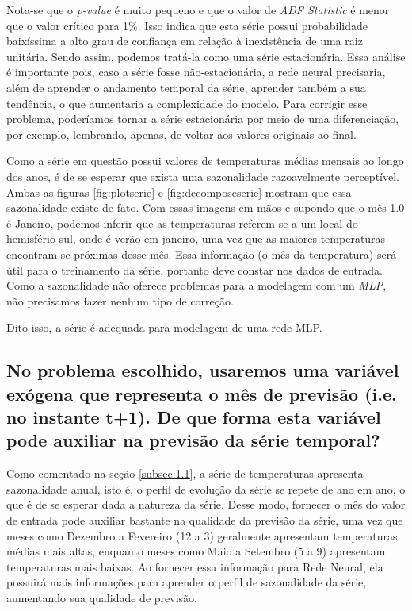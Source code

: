 \documentclass[12pt]{article}
\begin{document}
	Nota-se que o \textit{p-value} é muito pequeno e que o valor de \textit{ADF Statistic} é menor que o valor crítico para 1\%. Isso indica que esta série possui probabilidade baixíssima a alto grau de confiança em relação à inexistência de uma raiz unitária. Sendo assim, podemos tratá-la como uma série estacionária. Essa análise é importante pois, caso a série fosse não-estacionária, a rede neural precisaria, além de aprender o andamento temporal da série, aprender também a sua tendência, o que aumentaria a complexidade do modelo. Para corrigir esse problema, poderíamos tornar a série estacionária por meio de uma diferenciação, por exemplo, lembrando, apenas, de voltar aos valores originais ao final.
	
	Como a série em questão possui valores de temperaturas médias mensais ao longo dos anos, é de se esperar que exista uma sazonalidade razoavelmente perceptível. Ambas as figuras \ref{fig:plotserie} e \ref{fig:decomposeserie} mostram que essa sazonalidade existe de fato. Com essas imagens em mãos e supondo que o mês 1.0 é Janeiro, podemos inferir que as temperaturas referem-se a um local do hemisfério sul, onde é verão em janeiro, uma vez que as maiores temperaturas encontram-se próximas desse mês. Essa informação (o mês da temperatura) será útil para o treinamento da série, portanto deve constar nos dados de entrada. Como a sazonalidade não oferece problemas para a modelagem com um \textit{MLP}, não precisamos fazer nenhum tipo de correção.
	
	Dito isso, a série é adequada para modelagem de uma rede MLP.
	
	\subsection{No problema escolhido, usaremos uma variável exógena que representa	o mês de previsão (i.e. no instante t+1). De que forma esta variável pode auxiliar na previsão da série temporal?}
	
	Como comentado na seção \ref{subsec:1.1}, a série de temperaturas apresenta sazonalidade anual, isto é, o perfil de evolução da série se repete de ano em ano, o que é de se esperar dada a natureza da série. Desse modo, fornecer o mês do valor de entrada pode auxiliar bastante na qualidade da previsão da série, uma vez que meses como Dezembro a Fevereiro (12 a 3) geralmente apresentam temperaturas médias mais altas, enquanto meses como Maio a Setembro (5 a 9) apresentam temperaturas mais baixas. Ao fornecer essa informação para Rede Neural, ela possuirá mais informações para aprender o perfil de sazonalidade da série, aumentando sua qualidade de previsão. 
	
\end{document}
